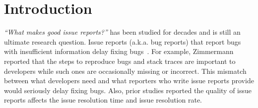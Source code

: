 \section{Introduction}
\label{sec:intro}
{\it ``What makes good issue reports?''} has been studied for decades and 
is still an ultimate research question. 
Issue reports (a.k.a. bug reports) that report bugs with 
insufficient information delay fixing bugs~\citep{DBLP:conf/msr/JoorabchiMM14}. 
For example, Zimmermann~\et~\citep{zimmermann2010TSE} reported 
that the steps to reproduce bugs and stack traces are important 
to developers while such ones are occasionally missing or incorrect. 
This mismatch between what developers need and 
what reporters who write issue reports provide would seriously delay fixing bugs. 
Also, prior studies reported the quality of issue reports affects 
the issue resolution time and 
issue resolution rate. 





